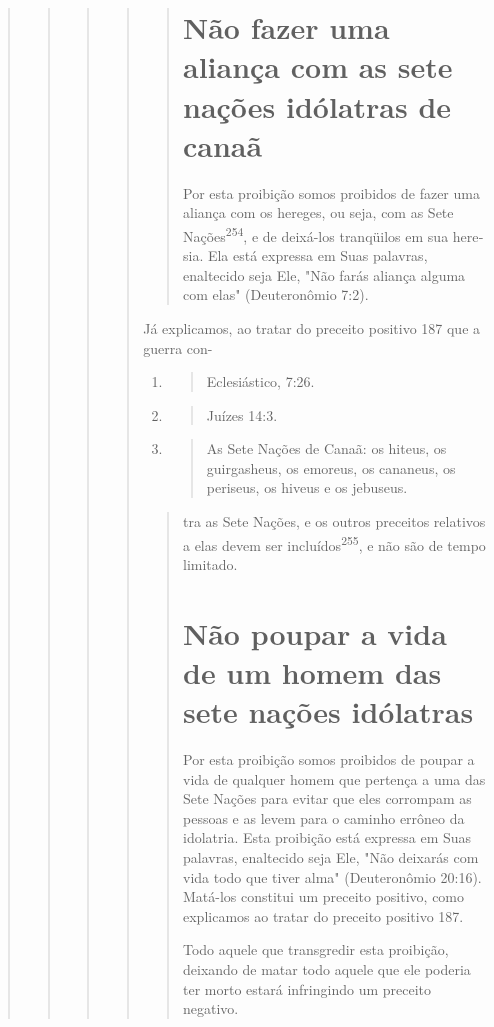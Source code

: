 \begin{quote}
\begin{quote}
\begin{quote}
\begin{quote}
\begin{quote}
\section{Não fazer uma aliança com as sete nações idólatras de canaã}

Por esta proibição somos proibidos de fazer uma aliança com os he­reges,
ou seja, com as Sete Nações\textsuperscript{254}, e de deixá-los
tranqüilos em sua here­sia. Ela está expressa em Suas palavras,
enaltecido seja Ele, "Não farás aliança alguma com elas" (Deuteronômio
7:2).
\end{quote}

Já explicamos, ao tratar do preceito positivo 187 que a guerra con-

\begin{enumerate}
\def\labelenumi{\arabic{enumi}.}
\setcounter{enumi}{251}
\item
 \begin{quote}
 Eclesiástico, 7:26.
 \end{quote}
\item
 \begin{quote}
 Juízes 14:3.
 \end{quote}
\item
 \begin{quote}
 As Sete Nações de Canaã: os hiteus, os guirgasheus, os emoreus, os
 cananeus, os periseus, os hiveus e os jebuseus.
 \end{quote}
\end{enumerate}

\begin{quote}

tra as Sete Nações, e os outros preceitos relativos a elas devem ser
incluídos\textsuperscript{255}, e não são de tempo limitado.

\section{Não poupar a vida de um homem das sete nações idólatras}

Por esta proibição somos proibidos de poupar a vida de qualquer homem
que pertença a uma das Sete Nações para evitar que eles corrompam as
pessoas e as levem para o caminho errôneo da idolatria. Esta proibição
está expressa em Suas palavras, enaltecido seja Ele, "Não deixarás com
vida todo que tiver alma" (Deuteronômio 20:16). Matá-los constitui um
preceito positi­vo, como explicamos ao tratar do preceito positivo 187.

Todo aquele que transgredir esta proibição, deixando de matar to­do
aquele que ele poderia ter morto estará infringindo um preceito
negativo.


\end{quote}
\end{quote}
\end{quote}
\end{quote}
\end{quote}

